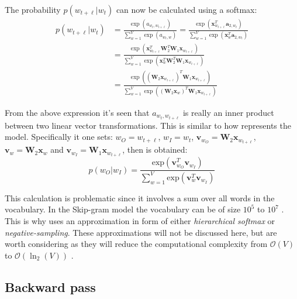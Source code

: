 The probability $p(w_{t + \ell} | w_t)$ can now be calculated using a softmax:
\begin{equation}
\begin{aligned}
p(w_{t + \ell} | w_t)
&= \frac{
	\exp(a_{w_t, w_{t + \ell}})
}{
	\sum_{w=1}^V \exp(a_{w_t, w})
}
= \frac{
	\exp( \mathbf{x}_{w_{t+\ell}}^T \mathbf{a}_{2,w_t} )
}{
	\sum_{w=1}^V \exp(\mathbf{x}_{w}^T \mathbf{a}_{2,w_t})
} \\
&= \frac{
	\exp( \mathbf{x}_{w_{t+\ell}}^T \mathbf{W}_2^T \mathbf{W}_1 \mathbf{x}_{w_{t+\ell}})
}{
	\sum_{w=1}^V \exp(\mathbf{x}_{w}^T \mathbf{W}_2^T \mathbf{W}_1 \mathbf{x}_{w_{t+\ell}})
} \\
&= \frac{
	\exp( \left(\mathbf{W}_2 \mathbf{x}_{w_{t+\ell}} \right)^T \mathbf{W}_1 \mathbf{x}_{w_{t+\ell}})
}{
	\sum_{w=1}^V \exp( \left(\mathbf{W}_2 \mathbf{x}_{w}\right)^T \mathbf{W}_1 \mathbf{x}_{w_{t+\ell}})
}
\end{aligned}
\end{equation}

From the above expression it's seen that $a_{w_t, w_{t + \ell}}$ is really an inner product between two linear vector transformations. This is similar to how \cite{word2vec-details} represents the model. Specifically it one sets: $w_O = w_{t + \ell}$, $w_I = w_t$, $\mathbf{v}_{w_O} = \mathbf{W}_2 \mathbf{x}_{w_{t+\ell}}$, $\mathbf{v}_{w} = \mathbf{W}_2 \mathbf{x}_{w}$ and $\mathbf{v}_{w_I} = \mathbf{W}_1 \mathbf{x}_{w_{t + \ell}}$, then \cite[eq. 2]{word2vec-details} is obtained:
\begin{equation}
p(w_O | w_I) = \frac{
	\mathrm{exp}( \mathbf{v}_{w_O}^T \mathbf{v}_{w_I} )
}{
	\sum_{w=1}^V \mathrm{exp}( \mathbf{v}_{w}^T \mathbf{v}_{w_I} )
}
\end{equation}

This calculation is problematic since it involves a sum over all words in the vocabulary. In the Skip-gram model the vocabulary can be of size $10^5$ to $10^7$ \cite{word2vec-details}. This is why \cite{word2vec-comparing, word2vec-details, word2vec-explained} uses an approximation in form of either \textit{hierarchical softmax} or \textit{negative-sampling}. These approximations will not be discussed here, but are worth considering as they will reduce the computational complexity from $\mathcal{O}(V)$ to $\mathcal{O}(\ln_2(V))$ \cite{word2vec-comparing}.

\subsection{Backward pass}

